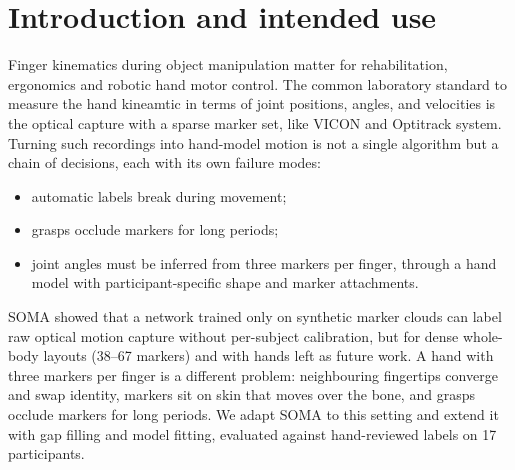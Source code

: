 \documentclass[11pt,a4paper]{article}
\begin{document}
\section{Introduction and intended use}\label{sec:intro}
Finger kinematics during object manipulation matter for rehabilitation, ergonomics and robotic hand motor control. The common laboratory standard to measure the hand kineamtic in terms of joint positions, angles, and  velocities
 is the optical
capture with a sparse marker set, like VICON and Optitrack system.
 Turning such recordings into hand-model motion is
not a single algorithm but a chain of decisions, each with its own failure modes:
\begin{itemize}[nosep]
  \item automatic labels break during movement;
  \item grasps occlude markers for long periods;
  \item joint angles must be inferred from three markers per finger, through a hand model with participant-specific shape and marker
  attachments.
\end{itemize}
SOMA \citep{ghorbani2021soma} showed that a network trained only on synthetic marker clouds can label raw optical
motion capture without per-subject calibration, but for dense whole-body layouts (38--67 markers) and with hands left as
future work. A hand with three markers per finger is a different problem: neighbouring fingertips converge and swap
identity, markers sit on skin that moves over the bone, and grasps occlude markers for long periods. We adapt SOMA to
this setting and extend it with gap filling and model fitting, evaluated against hand-reviewed labels on 17
participants.
\end{document}
